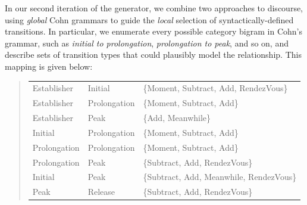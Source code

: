In our second iteration of the generator, we combine two
approaches to discourse, using {\em global} Cohn grammars to guide the {\em
local} selection of syntactically-defined transitions.
%
%
In particular, we enumerate every possible category bigram in Cohn's grammar,
such as {\em initial to prolongation}, {\em prolongation to peak}, and so
on, and describe sets of transition types that could plausibly model the
relationship. This mapping is given below:


\begin{quotation}
{\small
\begin{tabular}{lll}
Establisher & Initial & \{Moment, Subtract, Add, RendezVous\} \\
   Establisher & Prolongation & \{Moment, Subtract, Add\} \\
   Establisher & Peak & \{Add, Meanwhile\} \\
   Initial & Prolongation & \{Moment, Subtract, Add\} \\
   Prolongation & Prolongation & \{Moment, Subtract, Add\} \\
   Prolongation & Peak & \{Subtract, Add, RendezVous\} \\
   Initial & Peak & \{Subtract, Add, Meanwhile, RendezVous\} \\
   Peak & Release & \{Subtract, Add, RendezVous\}
\end{tabular}
}
\end{quotation}

